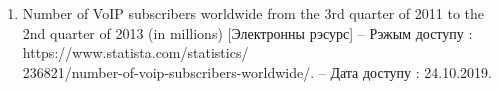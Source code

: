 
\begin{enumerate}[{label=\arabic{*}}]
    \item Number of VoIP subscribers worldwide from the 3rd quarter of 2011 to the 2nd quarter of 2013 (in millions)
          [Электронны рэсурс] --
          Рэжым доступу : 
          https://www.statista.com/statistics/ \\
          236821/number-of-voip-subscribers-worldwide/. --
          Дата доступу : 24.10.2019.
          \label{stat: VoIP-world-2013}
\end{enumerate}
